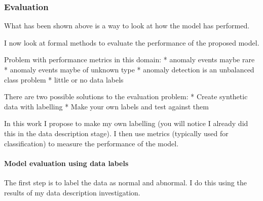 \documentclass[11pt]{article}
\begin{document}
    \subsubsection{Evaluation}\label{evaluation}

What has been shown above is a way to look at how the model has
performed.

I now look at formal methods to evaluate the performance of the proposed
model.

Problem with performance metrics in this domain: * anomaly events maybe
rare * anomaly events maybe of unknown type * anomaly detection is an
unbalanced class problem * little or no data labels

There are two possible solutions to the evaluation problem: * Create
synthetic data with labelling * Make your own labels and test against
them

In this work I propose to make my own labelling (you will notice I
already did this in the data description stage). I then use metrics
(typically used for classification) to measure the performance of the
model.

    \paragraph{Model evaluation using data
labels}\label{model-evaluation-using-data-labels}

The first step is to label the data as normal and abnormal. I do this
using the results of my data description investigation.
\end{document}
